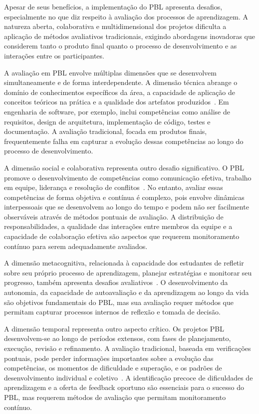\documentclass[english, spanish, brazilian]{modelo_dt}
\begin{document}
Apesar de seus benefícios, a implementação do PBL apresenta desafios, especialmente no que diz respeito à avaliação dos processos de aprendizagem. A natureza aberta, colaborativa e multidimensional dos projetos dificulta a aplicação de métodos avaliativos tradicionais, exigindo abordagens inovadoras que considerem tanto o produto final quanto o processo de desenvolvimento e as interações entre os participantes.

A avaliação em PBL envolve múltiplas dimensões que se desenvolvem simultaneamente e de forma interdependente. A dimensão técnica abrange o domínio de conhecimentos específicos da área, a capacidade de aplicação de conceitos teóricos na prática e a qualidade dos artefatos produzidos~\parencite{guo2020systematic}. Em engenharia de software, por exemplo, inclui competências como análise de requisitos, design de arquitetura, implementação de código, testes e documentação. A avaliação tradicional, focada em produtos finais, frequentemente falha em capturar a evolução dessas competências ao longo do processo de desenvolvimento.

A dimensão social e colaborativa representa outro desafio significativo. O PBL promove o desenvolvimento de competências como comunicação efetiva, trabalho em equipe, liderança e resolução de conflitos~\parencite{khuankrue2017agent}. No entanto, avaliar essas competências de forma objetiva e contínua é complexo, pois envolve dinâmicas interpessoais que se desenvolvem ao longo do tempo e podem não ser facilmente observáveis através de métodos pontuais de avaliação. A distribuição de responsabilidades, a qualidade das interações entre membros da equipe e a capacidade de colaboração efetiva são aspectos que requerem monitoramento contínuo para serem adequadamente avaliados.

A dimensão metacognitiva, relacionada à capacidade dos estudantes de refletir sobre seu próprio processo de aprendizagem, planejar estratégias e monitorar seu progresso, também apresenta desafios avaliativos~\parencite{kolb1984experiential}. O desenvolvimento da autonomia, da capacidade de autoavaliação e da aprendizagem ao longo da vida são objetivos fundamentais do PBL, mas sua avaliação requer métodos que permitam capturar processos internos de reflexão e tomada de decisão.

A dimensão temporal representa outro aspecto crítico. Os projetos PBL desenvolvem-se ao longo de períodos extensos, com fases de planejamento, execução, revisão e refinamento. A avaliação tradicional, baseada em verificações pontuais, pode perder informações importantes sobre a evolução das competências, os momentos de dificuldade e superação, e os padrões de desenvolvimento individual e coletivo~\parencite{kumar2022development}. A identificação precoce de dificuldades de aprendizagem e a oferta de feedback oportuno são essenciais para o sucesso do PBL, mas requerem métodos de avaliação que permitam monitoramento contínuo.
\end{document}
